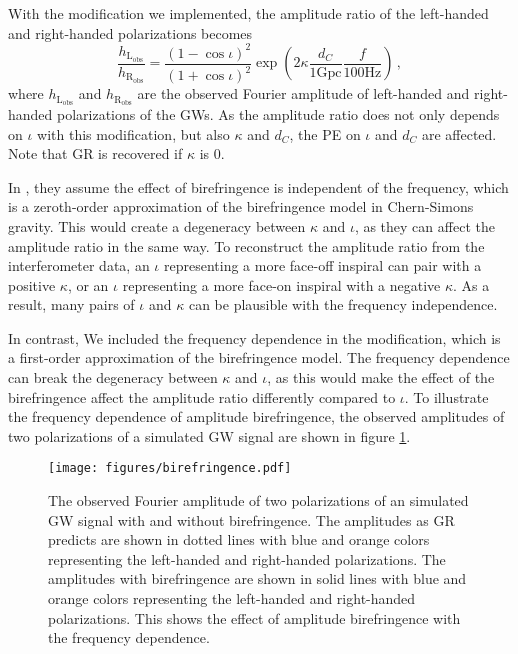 \documentclass[aps,prd,twocolumn,superscriptaddress,preprintnumbers,floatfix,nofootinbib]{revtex4-2}
\begin{document}
With the modification we implemented, the amplitude ratio of the left-handed and right-handed polarizations becomes 
\begin{equation}
    \frac{h_\mathrm{L_{obs}}}{h_\mathrm{R_{obs}}}=\frac{\left(1-\cos\iota\right)^2}{\left(1+\cos\iota\right)^2}\exp\left({2\kappa\frac{d_C}{1\mathrm{Gpc}}\frac{f}{100\mathrm{Hz}}}\right)\,,
\end{equation}
where $h_\mathrm{L_{obs}}$ and $h_\mathrm{R_{obs}}$ are the observed Fourier amplitude of left-handed and right-handed polarizations of the GWs.
As the amplitude ratio does not only depends on $\iota$ with this modification, but also $\kappa$ and $d_C$, the PE on $\iota$ and $d_C$ are affected.
Note that GR is recovered if $\kappa$ is $0$.

In \citet{Okounkova_2022}, they assume the effect of birefringence is independent of the frequency, which is a zeroth-order approximation of the birefringence model in Chern-Simons gravity.
This would create a degeneracy between $\kappa$ and $\iota$, as they can affect the amplitude ratio in the same way.
To reconstruct the amplitude ratio from the interferometer data, an $\iota$ representing a more face-off inspiral can pair with a positive $\kappa$, or an $\iota$ representing a more face-on inspiral with a negative $\kappa$.
As a result, many pairs of $\iota$ and $\kappa$ can be plausible with the frequency independence.

In contrast, We included the frequency dependence in the modification, which is a first-order approximation of the birefringence model.
The frequency dependence can break the degeneracy between $\kappa$ and $\iota$, as this would make the effect of the birefringence affect the amplitude ratio differently compared to $\iota$.
To illustrate the frequency dependence of amplitude birefringence, the observed amplitudes of two polarizations of a simulated GW signal are shown in figure \ref{fig:birefringence}.

\begin{figure}[h]
    \texttt{[image: figures/birefringence.pdf]}
    \caption{
        The observed Fourier amplitude of two polarizations of an simulated GW signal with and without birefringence.
        The amplitudes as GR predicts are shown in dotted lines with blue and orange colors representing the left-handed and right-handed polarizations.
        The amplitudes with birefringence are shown in solid lines with blue and orange colors representing the left-handed and right-handed polarizations.
        This shows the effect of amplitude birefringence with the frequency dependence.
    }
    \label{fig:birefringence}
\end{figure}
\end{document}
